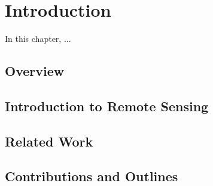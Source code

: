 \chapter{Introduction}
\label{chap-1-intro}
\begin{ChapAbstract}
In this chapter, ...
\end{ChapAbstract}


\section{Overview} %

\section{Introduction to Remote Sensing} %

\section{Related Work} %

\section{Contributions and Outlines} %

